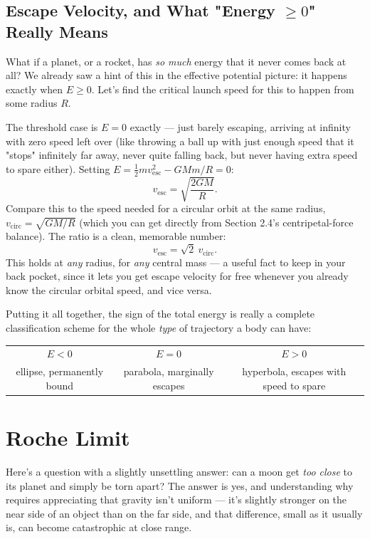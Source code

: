 \documentclass[11pt]{article}
\begin{document}
\subsection{Escape Velocity, and What "Energy $\geq0$" Really Means}

What if a planet, or a rocket, has \emph{so much} energy that it never comes back at all? We
already saw a hint of this in the effective potential picture: it happens exactly when $E\geq0$.
Let's find the critical launch speed for this to happen from some radius $R$.

The threshold case is $E=0$ exactly --- just barely escaping, arriving at infinity with zero speed
left over (like throwing a ball up with just enough speed that it "stops" infinitely far away,
never quite falling back, but never having extra speed to spare either). Setting
$E=\frac12mv_{\text{esc}}^2-GMm/R=0$:
\[
\boxed{v_{\text{esc}} = \sqrt{\frac{2GM}{R}}.}
\]
Compare this to the speed needed for a circular orbit at the same radius,
$v_{\text{circ}}=\sqrt{GM/R}$ (which you can get directly from Section 2.4's centripetal-force
balance). The ratio is a clean, memorable number:
\[
v_{\text{esc}} = \sqrt2\ v_{\text{circ}}.
\]
This holds at \emph{any} radius, for \emph{any} central mass --- a useful fact to keep in your back
pocket, since it lets you get escape velocity for free whenever you already know the circular
orbital speed, and vice versa.

Putting it all together, the sign of the total energy is really a complete classification scheme
for the whole \emph{type} of trajectory a body can have:

\begin{center}
\begin{tabular}{ccc}
$E<0$ & $E=0$ & $E>0$ \\
ellipse, permanently bound & parabola, marginally escapes & hyperbola, escapes with speed to spare
\end{tabular}
\end{center}

\section{Roche Limit}

Here's a question with a slightly unsettling answer: can a moon get \emph{too close} to its
planet and simply be torn apart? The answer is yes, and understanding why requires appreciating
that gravity isn't uniform --- it's slightly stronger on the near side of an object than on the far
side, and that difference, small as it usually is, can become catastrophic at close range.
\end{document}
